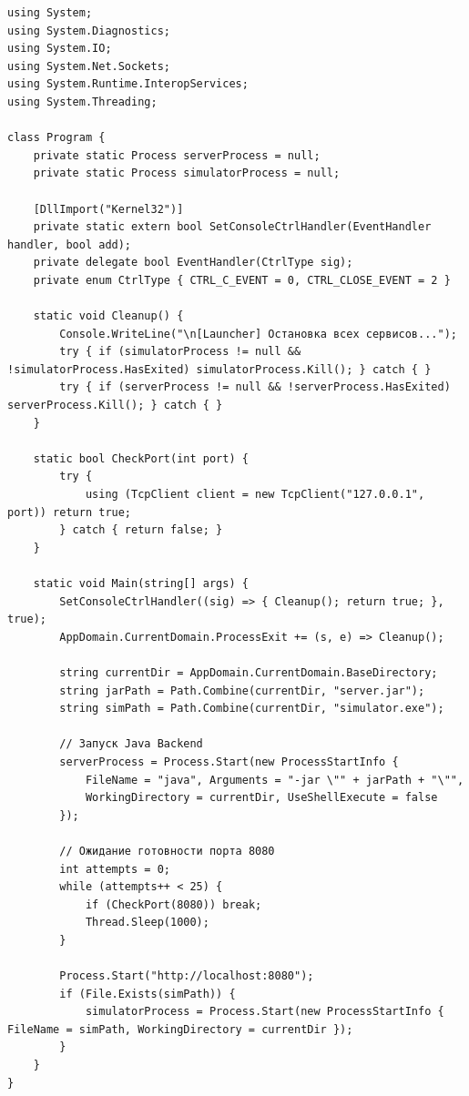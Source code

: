 \documentclass[14pt, a4paper]{extarticle}
\begin{document}
\begin{lstlisting}[language={[Sharp]C}, caption=Оркестрация и перехват сигналов завершения в Launcher.cs]
using System;
using System.Diagnostics;
using System.IO;
using System.Net.Sockets;
using System.Runtime.InteropServices;
using System.Threading;

class Program {
    private static Process serverProcess = null;
    private static Process simulatorProcess = null;

    [DllImport("Kernel32")]
    private static extern bool SetConsoleCtrlHandler(EventHandler handler, bool add);
    private delegate bool EventHandler(CtrlType sig);
    private enum CtrlType { CTRL_C_EVENT = 0, CTRL_CLOSE_EVENT = 2 }

    static void Cleanup() {
        Console.WriteLine("\n[Launcher] Остановка всех сервисов...");
        try { if (simulatorProcess != null && !simulatorProcess.HasExited) simulatorProcess.Kill(); } catch { }
        try { if (serverProcess != null && !serverProcess.HasExited) serverProcess.Kill(); } catch { }
    }

    static bool CheckPort(int port) {
        try {
            using (TcpClient client = new TcpClient("127.0.0.1", port)) return true;
        } catch { return false; }
    }

    static void Main(string[] args) {
        SetConsoleCtrlHandler((sig) => { Cleanup(); return true; }, true);
        AppDomain.CurrentDomain.ProcessExit += (s, e) => Cleanup();

        string currentDir = AppDomain.CurrentDomain.BaseDirectory;
        string jarPath = Path.Combine(currentDir, "server.jar");
        string simPath = Path.Combine(currentDir, "simulator.exe");

        // Запуск Java Backend
        serverProcess = Process.Start(new ProcessStartInfo {
            FileName = "java", Arguments = "-jar \"" + jarPath + "\"",
            WorkingDirectory = currentDir, UseShellExecute = false
        });

        // Ожидание готовности порта 8080
        int attempts = 0;
        while (attempts++ < 25) {
            if (CheckPort(8080)) break;
            Thread.Sleep(1000);
        }

        Process.Start("http://localhost:8080");
        if (File.Exists(simPath)) {
            simulatorProcess = Process.Start(new ProcessStartInfo { FileName = simPath, WorkingDirectory = currentDir });
        }
    }
}
\end{lstlisting}
\end{document}
